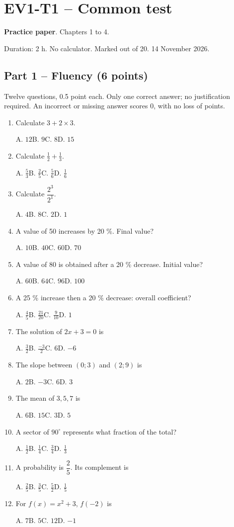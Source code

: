 \clearpage\section*{EV1-T1 -- Common test}\label{EV1-T1}
\textbf{Practice paper}. Chapters 1 to 4.\par Duration: 2 h. No calculator. Marked out of 20. 14 November 2026.
\subsection*{Part 1 -- Fluency (6 points)}
Twelve questions, 0.5 point each. Only one correct answer; no justification required. An incorrect or missing answer scores 0, with no loss of points.
\begin{enumerate}
\item Calculate $3+2\times3$.\par A. $12$\quad B. $9$\quad C. $8$\quad D. $15$
\item Calculate $\frac12+\frac13$.\par A. $\frac{5}{3}$\quad B. $\frac{2}{5}$\quad C. $\frac{5}{6}$\quad D. $\frac{1}{6}$
\item Calculate $\dfrac{2^3}{2^{1}}$.\par A. $4$\quad B. $8$\quad C. $2$\quad D. $1$
\item A value of 50 increases by 20 \%. Final value?\par A. $10$\quad B. $40$\quad C. $60$\quad D. $70$
\item A value of 80 is obtained after a 20 \% decrease. Initial value?\par A. $60$\quad B. $64$\quad C. $96$\quad D. $100$
\item A 25 \% increase then a 20 \% decrease: overall coefficient?\par A. $\frac{4}{5}$\quad B. $\frac{21}{20}$\quad C. $\frac{9}{10}$\quad D. $1$
\item The solution of $2x+3=0$ is\par A. $\frac{3}{2}$\quad B. $\frac{-3}{2}$\quad C. $6$\quad D. $-6$
\item The slope between $(0;3)$ and $(2;9)$ is\par A. $2$\quad B. $-3$\quad C. $6$\quad D. $3$
\item The mean of $3, 5, 7$ is\par A. $6$\quad B. $15$\quad C. $3$\quad D. $5$
\item A sector of $90^\circ$ represents what fraction of the total?\par A. $\frac{1}{2}$\quad B. $\frac{1}{4}$\quad C. $\frac{3}{4}$\quad D. $\frac{1}{3}$
\item A probability is $\dfrac{2}{5}$. Its complement is\par A. $\frac{2}{5}$\quad B. $\frac{3}{5}$\quad C. $\frac{5}{2}$\quad D. $\frac{1}{5}$
\item For $f(x)=x^2+3$, $f(-2)$ is\par A. $7$\quad B. $5$\quad C. $12$\quad D. $-1$
\end{enumerate}

